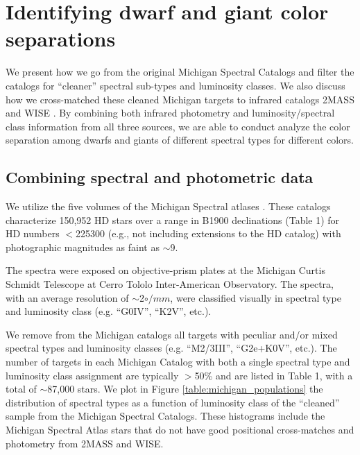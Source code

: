 \chapter{Identifying dwarf and giant color separations} \label{chap:identify_color_sep}


We present how we go from the original Michigan Spectral Catalogs \citep{Houk1975,Houk1978,Houk1982,Houk1988,Houk1999} and filter the catalogs for ``cleaner'' spectral sub-types and luminosity classes. We also discuss how we cross-matched these cleaned Michigan targets to infrared catalogs 2MASS and WISE \citep{2MASS,ALLWISE}. By combining both infrared photometry and luminosity/spectral class information from all three sources, we are able to conduct analyze the color separation among dwarfs and giants of different spectral types for different colors.

\section{Combining spectral and photometric data} \label{sec:cross-matching}
We utilize the five volumes of the Michigan Spectral atlases \citep[]{Houk1975, Houk1978, Houk1982,Houk1988,Houk1999}. These catalogs characterize 150,952 HD stars over a range in B1900 declinations (Table 1) for HD numbers $<$225300 (e.g., not including extensions to the HD catalog) with photographic magnitudes as faint as $\sim$9.

The spectra were exposed on objective-prism plates at the Michigan Curtis Schmidt Telescope at Cerro Tololo Inter-American Observatory. The spectra, with an average resolution of $\sim$2$\circ/mm$, were classified visually in spectral type and luminosity class (e.g. ``G0IV'', ``K2V'', etc.).  

We remove from the Michigan catalogs all targets with peculiar and/or mixed spectral types and luminosity classes (e.g. ``M2/3III'', ``G2e+K0V'', etc.).  The  number of targets in each Michigan Catalog with both a single spectral type and luminosity class assignment are typically $>$50\% and are listed in Table 1, with a total of $\sim$87,000 stars. We plot in Figure \ref{table:michigan_populations} the distribution of spectral types as a function of luminosity class of the ``cleaned'' sample from the Michigan Spectral Catalogs.  These histograms include the Michigan Spectral Atlas stars that do not have good positional cross-matches and photometry from 2MASS and WISE. 

